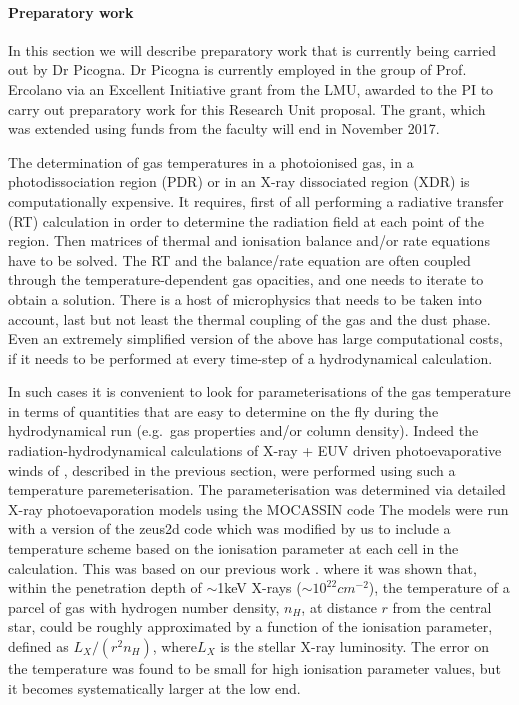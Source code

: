 \documentclass[10pt,fleqn,twoside]{article}
\begin{document}
\paragraph{Preparatory work}

In this section we will describe
preparatory work that is currently being carried out by Dr
Picogna. Dr Picogna is currently employed in the group of Prof. Ercolano via
an Excellent Initiative grant from the LMU, awarded to the PI to carry
out preparatory work for this Research Unit proposal. The grant, which
was extended using funds from the faculty will end in November
2017. 

The determination of gas temperatures in a photoionised gas, in a
photodissociation region (PDR) or in an X-ray dissociated region (XDR)
is computationally expensive. It requires, first of all 
performing a radiative transfer (RT) calculation in order to determine the
radiation field at each point of the region. Then matrices of thermal and
ionisation balance and/or rate equations have to be solved. The RT and
the balance/rate equation are often coupled through the
temperature-dependent gas opacities, and one needs to iterate to
obtain a solution. There is a host of microphysics
that needs to be taken into account, last but not least the thermal
coupling of the gas and the dust phase. Even an extremely simplified
version of the above has large computational costs, if it needs to be performed at
every time-step of a hydrodynamical calculation. 

In such cases it is convenient to look for parameterisations of the
gas temperature in terms of quantities that are easy to determine on
the fly during the hydrodynamical run (e.g.\ gas properties and/or column density). 
Indeed the radiation-hydrodynamical calculations of X-ray + EUV driven
photoevaporative winds of 
\citet{2010MNRAS.401.1415O, 2011MNRAS.412...13O, 2012MNRAS.422.1880O},
described in the previous section, were performed
using such a temperature paremeterisation. The parameterisation was
determined via detailed X-ray photoevaporation models using the
MOCASSIN code 
\citep{2008ApJ...688..398E, 2009ApJ...699.1639E}
The models were run with a version of the {\sc
  zeus2d} code which was modified by us to include a temperature
scheme based on the ionisation parameter at each cell in the
calculation. 
This was based on our previous work 
\citep{2008ApJ...688..398E, 2009ApJ...699.1639E}.
where it was shown that, within the
penetration depth of $\sim$1keV X-rays ($\sim 10^{22}cm^{-2}$), the
temperature of a parcel of gas with hydrogen number density, $n_H$, at
distance $r$ from the central star, could be roughly approximated by a
function of the ionisation parameter, defined as $L_X/(r^2 n_H)$,
where$L_X$ is the stellar X-ray luminosity. The error on the
temperature was found to be small for high ionisation parameter values, but it
becomes systematically larger at the low end. 
\end{document}
